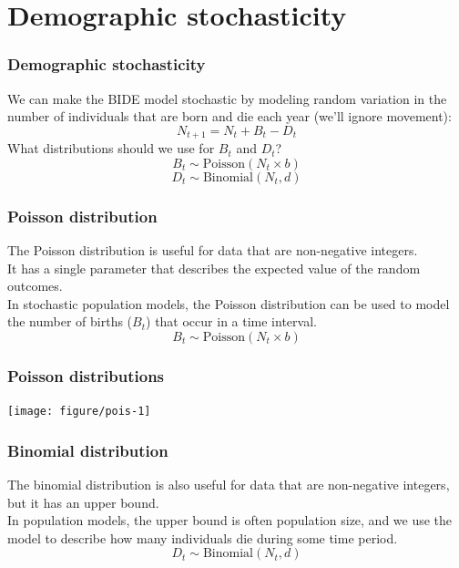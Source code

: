 \documentclass[color=usenames,dvipsnames]{beamer}\usepackage[]{graphicx}\usepackage[]{xcolor}
\newenvironment{knitrout}{}{} %
\begin{document}
\section{Demographic stochasticity}



\begin{frame}[fragile]
  \frametitle{Demographic stochasticity}
  We can make the BIDE model stochastic by modeling random variation
  in the number of individuals that are born and die each year (we'll
  ignore movement):
  \[
     N_{t+1} = N_t + B_t - D_t
  \]
  \pause
  \vfill
  What distributions should we use for $B_t$ and $D_t$? 
  \pause
  \[
    B_t \sim \mathrm{Poisson}(N_t\times b)
  \]
  \[
    D_t \sim \mathrm{Binomial}(N_t, d)
  \]
\end{frame}


\begin{frame}
  \frametitle{Poisson distribution}
  The Poisson distribution is useful for data that are non-negative
  integers. \\
  \vfill
  It has a single parameter that describes the expected value of the
  random outcomes. \\
  \vfill
  In stochastic population models, the Poisson distribution can be
  used to model the number of births ($B_t$) that occur in a time
  interval. 
  \vfill
  \[
    B_t \sim \mathrm{Poisson}(N_t \times b)
  \]
\end{frame}


\begin{frame}[fragile]
  \frametitle{Poisson distributions}
\begin{knitrout}
\color{fgcolor}

{\centering \texttt{[image: figure/pois-1]} 

}


\end{knitrout}
\end{frame}



\begin{frame}
  \frametitle{Binomial distribution}
  The binomial distribution is also useful for data that are
  non-negative integers, but it has an upper bound. \\
  \vfill
  In population models, the upper bound is often population size, and
  we use the model to describe how many individuals die during some
  time period. \\
  \[
    D_t \sim \mathrm{Binomial}(N_t, d)
  \]
\end{frame}
\end{document}
